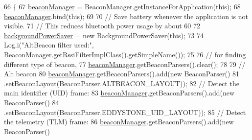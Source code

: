 \begin{DoxyCode}
66                                            \{
67         \hyperlink{classit_1_1unibo_1_1torsello_1_1bluetoothpositioning_1_1activities_1_1ApplicationActivity_a973c37226a3dbba6016966c3555aff65_a973c37226a3dbba6016966c3555aff65}{beaconManager} = BeaconManager.getInstanceForApplication(\textcolor{keyword}{this});
68         \hyperlink{classit_1_1unibo_1_1torsello_1_1bluetoothpositioning_1_1activities_1_1ApplicationActivity_a973c37226a3dbba6016966c3555aff65_a973c37226a3dbba6016966c3555aff65}{beaconManager}.bind(\textcolor{keyword}{this});
69 
70         \textcolor{comment}{// Save battery whenever the application is not visible.}
71         \textcolor{comment}{// This reduces bluetooth power usage by about 60%
72         \hyperlink{classit_1_1unibo_1_1torsello_1_1bluetoothpositioning_1_1activities_1_1ApplicationActivity_a85885639575161f4d73d4fc788f44ace_a85885639575161f4d73d4fc788f44ace}{backgroundPowerSaver} = \textcolor{keyword}{new} BackgroundPowerSaver(\textcolor{keyword}{this});
73 
74         Log.i(\textcolor{stringliteral}{"AltBeacon filter used:"}, BeaconManager.getRssiFilterImplClass().getSimpleName());
75 
76         \textcolor{comment}{// for finding different type of beacon,}
77         \hyperlink{classit_1_1unibo_1_1torsello_1_1bluetoothpositioning_1_1activities_1_1ApplicationActivity_a973c37226a3dbba6016966c3555aff65_a973c37226a3dbba6016966c3555aff65}{beaconManager}.getBeaconParsers().clear();
78 
79         \textcolor{comment}{// Alt beacon}
80         \hyperlink{classit_1_1unibo_1_1torsello_1_1bluetoothpositioning_1_1activities_1_1ApplicationActivity_a973c37226a3dbba6016966c3555aff65_a973c37226a3dbba6016966c3555aff65}{beaconManager}.getBeaconParsers().add(\textcolor{keyword}{new} BeaconParser()
81                 .setBeaconLayout(BeaconParser.ALTBEACON\_LAYOUT));
82         \textcolor{comment}{// Detect the main identifier (UID) frame:}
83         \hyperlink{classit_1_1unibo_1_1torsello_1_1bluetoothpositioning_1_1activities_1_1ApplicationActivity_a973c37226a3dbba6016966c3555aff65_a973c37226a3dbba6016966c3555aff65}{beaconManager}.getBeaconParsers().add(\textcolor{keyword}{new} BeaconParser()
84                 .setBeaconLayout(BeaconParser.EDDYSTONE\_UID\_LAYOUT));
85         \textcolor{comment}{// Detect the telemetry (TLM) frame:}
86         \hyperlink{classit_1_1unibo_1_1torsello_1_1bluetoothpositioning_1_1activities_1_1ApplicationActivity_a973c37226a3dbba6016966c3555aff65_a973c37226a3dbba6016966c3555aff65}{beaconManager}.getBeaconParsers().add(\textcolor{keyword}{new} BeaconParser()
}
\end{DoxyCode}
